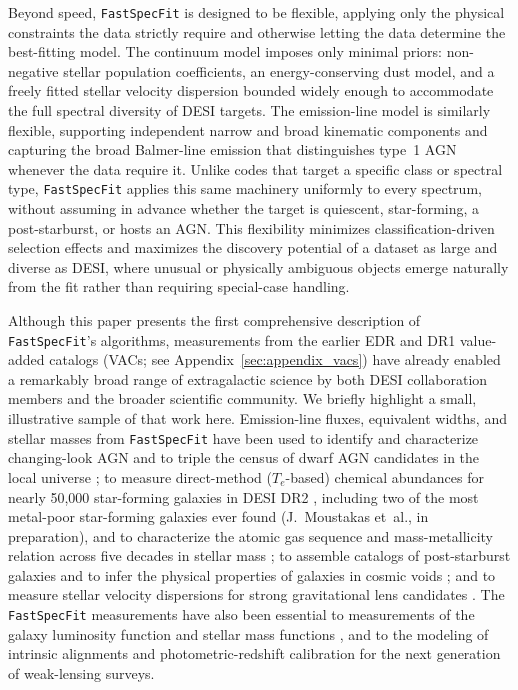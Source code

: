 \documentclass[modern,linenumbers]{aastex701}
\newcommand{\fastspecfit}{\texttt{FastSpecFit}}
\begin{document}
Beyond speed, \fastspecfit{} is designed to be flexible, applying only
the physical constraints the data strictly require and otherwise
letting the data determine the best-fitting model. The continuum model
imposes only minimal priors: non-negative stellar population
coefficients, an energy-conserving dust model, and a freely fitted
stellar velocity dispersion bounded widely enough to accommodate the
full spectral diversity of DESI targets. The emission-line model is
similarly flexible, supporting independent narrow and broad kinematic
components and capturing the broad Balmer-line emission that
distinguishes type~1 AGN whenever the data require it. Unlike codes
that target a specific class or spectral type, \fastspecfit{} applies
this same machinery uniformly to every spectrum, without assuming in
advance whether the target is quiescent, star-forming, a
post-starburst, or hosts an AGN. This flexibility minimizes
classification-driven selection effects and maximizes the discovery
potential of a dataset as large and diverse as DESI, where unusual or
physically ambiguous objects emerge naturally from the fit rather than
requiring special-case handling.

Although this paper presents the first comprehensive description of
\fastspecfit{}'s algorithms, measurements from the earlier EDR and DR1
value-added catalogs (VACs; see Appendix~\ref{sec:appendix_vacs}) have
already enabled a remarkably broad range of extragalactic science by
both DESI collaboration members and the broader scientific
community. We briefly highlight a small, illustrative sample of that
work here. Emission-line fluxes, equivalent widths, and stellar masses
from \fastspecfit{} have been used to identify and characterize
changing-look AGN \citep{guo25a} and to triple the census of dwarf AGN
candidates in the local universe \citep{pucha25a}; to measure
direct-method ($T_e$-based) chemical abundances for nearly 50,000
star-forming galaxies in DESI DR2 \citep{scholte26a}, including two of
the most metal-poor star-forming galaxies ever found (J.~Moustakas
et~al., in preparation), and to characterize the atomic gas sequence
and mass-metallicity relation across five decades in stellar mass
\citep{scholte24a}; to assemble catalogs of post-starburst galaxies
\citep{soto25a} and to infer the physical properties of galaxies in
cosmic voids \citep{rincon25a}; and to measure stellar velocity
dispersions for strong gravitational lens candidates
\citep{huang25a}. The \fastspecfit{} measurements have also been
essential to measurements of the galaxy luminosity function
\citep{moore26a} and stellar mass functions \citep{wang25a}, and to
the modeling of intrinsic alignments \citep{siegel25a} and
photometric-redshift calibration \citep{blanco25a} for the next
generation of weak-lensing surveys.
\end{document}
